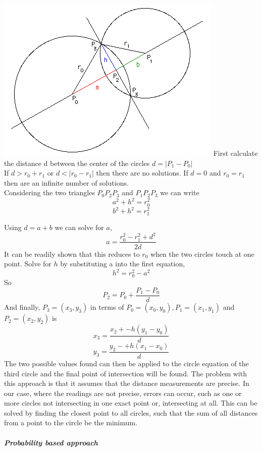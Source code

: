 \includegraphics[scale=0.4]{DIAGRAMS/circles.png}
First calculate the distance d between the center of the circles $d = |P_1 - P_0|$\\
If $d > r_0 + r_1$ or $d < |r_0 - r_1|$ then there are no solutions. If $d = 0$ and $r_0 = r_1$ then are an infinite number of solutions.\\
Considering the two triangles $P_0P_2P_3$ and $P_1P_2P_3$ we can write $$a^2 + h^2 = r_0^2$$ $$b^2 + h^2 = r_1^2$$

\noindent Using $d = a + b$ we can solve for $a$,
$$a = \frac{r_0^2 - r_1^2 +d^2}{2d}$$
It can be readily shown that this reduces to $r_0$ when the two circles touch at one point.
Solve for $h$ by substituting a into the first equation, $$h^2 = r_0^2 - a^2$$
So $$P_2 = P_0 + \frac{P_1 - P_0}{d}$$
And finally, $P_3 = (x_3, y_3)$ in terms of $P_0 = (x_0, y_0),  P_1 = (x_1, y_1)$ and $P_2 = (x_2, y_2)$ is $$x_3 =\frac{x_2 + -h(y_1 - y_0)}{d}$$ $$y_3 =\frac{y_2 - +h(x_1 - x_0)}{d}$$
The two possible values found can then be applied to the circle equation of the third circle and the final point of intersection will be found. The problem with this approach is that it assumes that the distance measurements are precise. In our case, where the readings are not precise, errors can occur, such as one or more circles not intersecting in one exact point or, intersecting at all. This can be solved by finding the closest point to all circles, such that the sum of all distances from a point to the circle be the minimum.\\
\\
\textit{\textbf{Probability based approach}}

